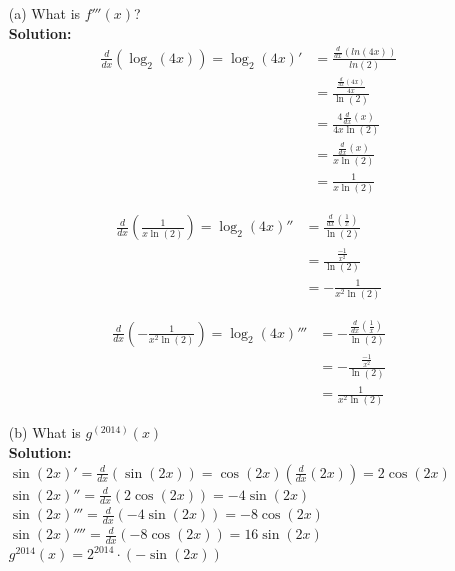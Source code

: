 \documentclass[a4paper]{article}
\begin{document}
\begin{enumerate}
	\begin{enumerate}
		\item[(a)] What is $f'''(x)$?\\
\textbf{Solution:}\\


\begin{align*}
\frac{d}{dx}(\log_2(4x)) = \log_2(4x)' &= \frac{\frac{d}{dx}(ln(4x))}{ln(2)}\\
&= \frac{\frac{\frac{d}{dx}(4x)}{4x}}{\ln(2)}\\
&= \frac{4 \frac{d}{dx}(x)}{4x \ln(2)}\\ 
&= \frac{\frac{d}{dx}(x)}{x \ln(2)}\\
&= \frac{1}{x \ln(2)}
\end{align*}

\begin{align*}
	\frac{d}{dx}(\frac{1}{x \ln(2)}) = \log_2(4x)'' &= \frac{\frac{d}{dx}(\frac{1}{x})}{\ln(2)}\\
	&= \frac{\frac{-1}{x^2}}{\ln(2)}\\
	&= -\frac{1}{x^2 \ln(2)}
\end{align*}
		
		
\begin{align*}
	\frac{d}{dx}(-\frac{1}{x^2 \ln(2)}) = \log_2(4x)''' &= -\frac{\frac{d}{dx}(\frac{1}{x})}{\ln(2)}\\
	&= -\frac{\frac{-1}{x^2}}{\ln(2)}\\
	&= \frac{1}{x^2 \ln(2)}
\end{align*}		
		
		
		\item[(b)] What is $g^{(2014)}(x)$\\
		\textbf{Solution:}\\
		
$\sin(2x)' = \frac{d}{dx}(\sin(2x)) = \cos(2x)(\frac{d}{dx}(2x)) = 2 \cos(2x)$\\

$\sin(2x)'' = \frac{d}{dx}(2 \cos(2x)) = -4 \sin(2x)$\\

$\sin(2x)''' = \frac{d}{dx}(-4 \sin(2x)) = -8 \cos(2x)$\\	
		
$\sin(2x)'''' = \frac{d}{dx}(-8 \cos(2x)) = 16 \sin(2x)$\\

$g^{2014}(x) = 2^{2014} \cdot (-\sin(2x))$\\
		
	\end{enumerate}
	

\end{enumerate}
\end{document}
